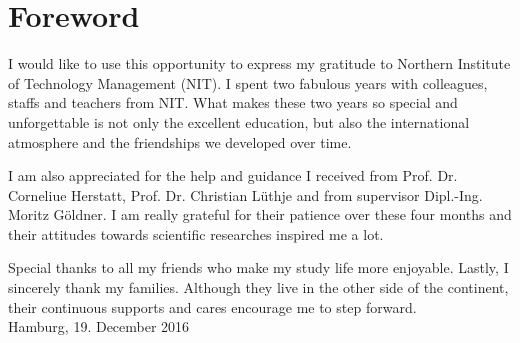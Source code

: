 \chapter*{Foreword}
\label{sec:vorwort}

I would like to use this opportunity to express my gratitude to Northern Institute of Technology Management (NIT). I spent two fabulous years with colleagues, staffs and teachers from NIT. What makes these two years so special and unforgettable is not only the excellent education, but also the international atmosphere and the friendships we developed over time.    

I am also appreciated for the help and guidance I received from Prof. Dr. Corneliue Herstatt, Prof. Dr. Christian L\"uthje and from supervisor Dipl.-Ing. Moritz G\"oldner. I am really grateful for their patience over these four months and their attitudes towards scientific researches inspired me a lot.

Special thanks to all my friends who make my study life more enjoyable. Lastly, I sincerely thank my families. Although they live in the other side of the continent, their continuous supports and cares encourage me to step forward.\\

\vspace{2cm}
Hamburg, 19. December 2016
